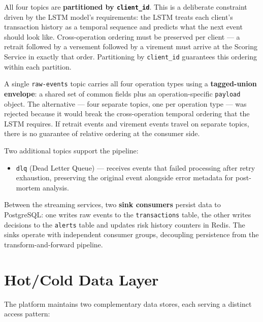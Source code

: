 All four topics are \textbf{partitioned by \texttt{client\_id}}. This is a deliberate
constraint driven by the LSTM model's requirements: the LSTM treats each client's
transaction history as a temporal sequence and predicts what the next event should
look like. Cross-operation ordering must be preserved per client --- a retrait
followed by a versement followed by a virement must arrive at the Scoring Service in
exactly that order. Partitioning by \texttt{client\_id} guarantees this ordering
within each partition.

A single \texttt{raw-events} topic carries all four operation types using a
\textbf{tagged-union envelope}: a shared set of common fields plus an
operation-specific \texttt{payload} object. The alternative --- four separate topics,
one per operation type --- was rejected because it would break the cross-operation
temporal ordering that the LSTM requires. If retrait events and virement events travel
on separate topics, there is no guarantee of relative ordering at the consumer side.

Two additional topics support the pipeline:

\begin{itemize}[leftmargin=2cm]
    \item \texttt{dlq} (Dead Letter Queue) --- receives events that failed processing
          after retry exhaustion, preserving the original event alongside error metadata
          for post-mortem analysis.
\end{itemize}

Between the streaming services, two \textbf{sink consumers} persist data to
PostgreSQL: one writes raw events to the \texttt{transactions} table, the other
writes decisions to the \texttt{alerts} table and updates risk history counters in
Redis. The sinks operate with independent consumer groups, decoupling persistence
from the transform-and-forward pipeline.

\section{Hot/Cold Data Layer}

The platform maintains two complementary data stores, each serving a distinct
access pattern:

